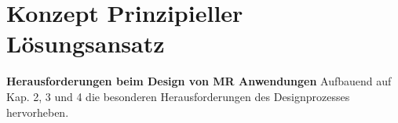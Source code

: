 \section{Konzept Prinzipieller Lösungsansatz}
\label{sec-4}

\textbf{Herausforderungen beim Design von MR Anwendungen}
Aufbauend auf Kap. 2, 3 und 4 die besonderen Herausforderungen des Designprozesses hervorheben. 
